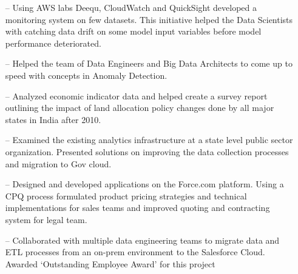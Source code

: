 \documentclass[10pt,a4paper]{altacv}
\begin{document}



\begin{itemize}
    \setlength{\itemindent}{0.5em}
    \item[--]  \small {Using AWS labs Deequ, CloudWatch and QuickSight developed a monitoring system on few datasets. This initiative helped the Data Scientists with catching data drift on some model input variables before model performance deteriorated.}
    \item[--]  \small {Helped the team of Data Engineers and Big Data Architects to come up to speed with concepts in Anomaly Detection.}
\end{itemize}




\begin{itemize}
   \setlength{\itemindent}{0.5em}
   \item[--]  \small {Analyzed economic indicator data and helped create a survey report outlining the impact of land allocation policy changes done by all major states in India after 2010.}
   \item[--]  \small {Examined the existing analytics infrastructure at a state level public sector organization. Presented solutions on improving the data collection processes and migration to Gov cloud.}
\end{itemize}




\begin{itemize}
    \setlength{\itemindent}{0.5em}
    \item[--]   \small{Designed and developed applications on the Force.com platform. Using a CPQ process formulated product pricing strategies and technical implementations for sales teams and improved quoting and contracting system for legal team.}
    \item[--]   \small{Collaborated with multiple data engineering teams to migrate data and ETL processes from an on-prem environment to the Salesforce Cloud. Awarded ‘Outstanding Employee Award’ for this project}
\end{itemize}
\end{document}
